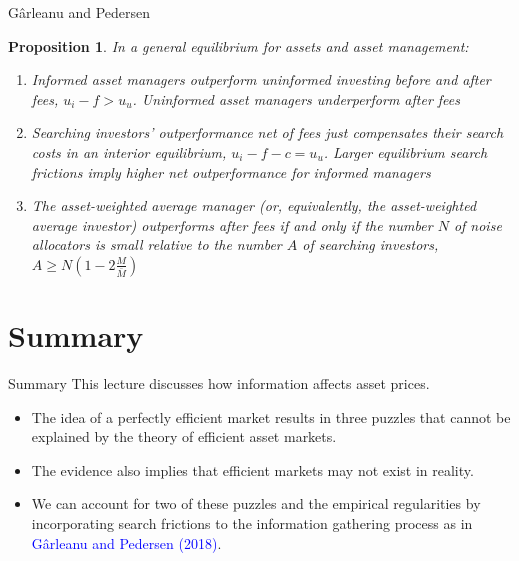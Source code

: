 \documentclass[aspectratio=169,xcolor=dvipsnames]{beamer}
\newtheorem{proposition}{Proposition}
\begin{document}
\begin{frame}{G\^arleanu and Pedersen}
    \begin{proposition}
        In a general equilibrium for assets and asset management:
        \begin{enumerate}
            \item Informed asset managers outperform uninformed investing before and after fees, $u_i - f > u_u$. Uninformed asset managers underperform after fees
            \item Searching investors' outperformance net of fees just compensates their search costs in an interior equilibrium, $u_i - f - c = u_u$. Larger equilibrium search frictions imply higher net outperformance for informed managers
            \item The asset-weighted average manager (or, equivalently, the asset-weighted average investor) outperforms after fees if and only if the number $N$ of noise allocators is small relative to the number $A$ of searching investors, $A \ge N\left(1 - 2\frac{M}{\bar M}\right)$
        \end{enumerate}
    \end{proposition}
\end{frame}

\section{Summary}

\begin{frame}{Summary}
    This lecture discusses how information affects asset prices.
    \begin{itemize}
        \item The idea of a perfectly efficient market results in three puzzles that cannot be explained by the theory of efficient asset markets.
        \item The evidence also implies that efficient markets may not exist in reality.
        \item We can account for two of these puzzles and the empirical regularities by incorporating search frictions to the information gathering process as in \textcolor{blue}{G\^arleanu and Pedersen (2018)}.
    \end{itemize}
\end{frame}
\end{document}
